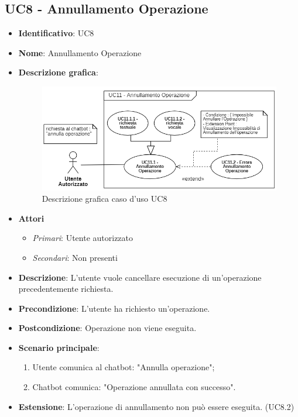 \subsection{UC8 - Annullamento Operazione }
\begin{itemize}
	\item \textbf{Identificativo}: UC8
	\item \textbf{Nome}: Annullamento Operazione
  \item \textbf{Descrizione grafica}:

\begin{figure}[h]
    \includegraphics[scale=1.20]{images/UC8.png} 
    \caption{Descrizione grafica caso d'uso UC8}
\end{figure}

	\item \textbf{Attori}
	\begin{itemize} 
		\item \textit{Primari}: Utente autorizzato
		\item \textit{Secondari}: Non presenti
	\end{itemize}
	\item \textbf{Descrizione}: L'utente vuole cancellare esecuzione di un'operazione precedentemente richiesta.
	\item \textbf{Precondizione}: L'utente ha richiesto un'operazione.
	\item \textbf{Postcondizione}: Operazione non viene eseguita.
	\item \textbf{Scenario principale}: \begin{enumerate}
		\item Utente comunica al chatbot: "Annulla operazione";
		\item Chatbot comunica: "Operazione annullata con successo".
	\end{enumerate}
  \item \textbf{Estensione}: L'operazione di annullamento non può essere eseguita. (UC8.2)
\end{itemize}

